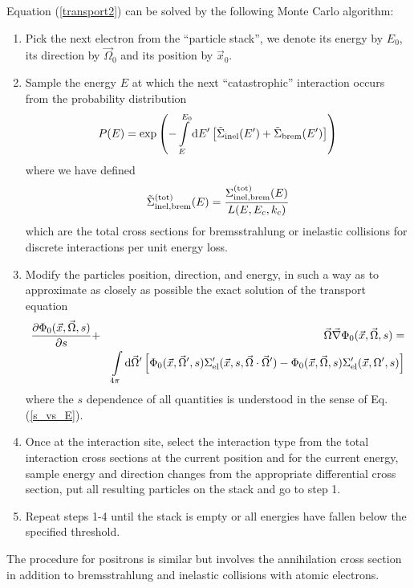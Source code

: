 Equation (\ref{transport2}) can be solved 
by the following Monte Carlo algorithm:
\begin{enumerate}
\item
Pick the next electron from the ``particle stack'', we 
denote its energy by $E_0$, its direction by $\vec{\Omega}_0$ and 
its position by $\vec{x}_0$. 
\item
Sample the energy $E$ at which the next ``catastrophic'' interaction occurs 
from the probability distribution 
\begin{equation}
\label{ch_Ps}
P(E) = \exp\left( - \int\limits_{E}^{E_0} {\rm d} E' 
\left[\tilde{\Sigma}_{\rm inel}(E') + \tilde{\Sigma}_{\rm brem}(E') \right] 
\right)
\end{equation}
where we have defined 
\begin{equation}
\tilde{\Sigma}_{\rm inel, brem}^{\rm (tot)}(E) = 
{\Sigma_{\rm inel,brem}^{\rm (tot)}(E) \over 
L(E,E_c,k_c)}
\end{equation}
which are the total cross sections for bremsstrahlung 
or inelastic collisions for discrete interactions per 
unit energy loss. 
\item
Modify the particles position, direction, and energy, in such a 
way as to approximate as closely as possible the 
exact solution of the transport equation
\begin{eqnarray}
\label{transport3}
{ \partial \Phi_0(\vec{x},\vec{\Omega},s) \over \partial s} & + & 
\vec{\Omega} \vec{\nabla} \Phi_0(\vec{x},\vec{\Omega},s) = 
\\
& & 
\int\limits_{4 \pi} {\rm d}\vec{\Omega}' 
\left[ \Phi_0(\vec{x},\vec{\Omega}',s) 
\Sigma_{\rm el}'(\vec{x},s,\vec{\Omega}\cdot\vec{\Omega}') - 
\Phi_0(\vec{x},\vec{\Omega},s) \Sigma_{\rm el}'(\vec{x},\Omega',s) \right] 
\nonumber 
\end{eqnarray}
where the $s$ dependence of all quantities is understood 
in the sense of Eq. (\ref{s_vs_E}). 
\item
Once at the interaction site, select the interaction type from 
the total interaction cross sections at the current position and 
for the current energy, sample energy and direction changes 
from the appropriate differential cross section, put 
all resulting particles on the stack and go to step 1.
\item
Repeat steps 1-4 until the stack is empty or all energies have 
fallen below the specified threshold.
\end{enumerate}
The procedure for positrons is similar but involves the 
annihilation cross section in addition to bremsstrahlung 
and inelastic collisions with atomic electrons.    

